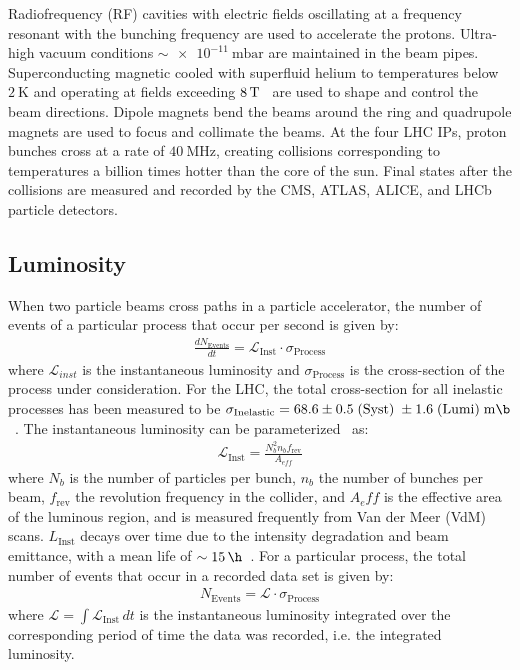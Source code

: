 Radiofrequency (RF) cavities with electric fields oscillating at a frequency resonant with the bunching frequency are used to accelerate the protons.
Ultra-high vacuum conditions $\sim \SI{e-11}{\m \bar}$ are maintained in the beam pipes.
Superconducting magnetic cooled with superfluid helium to temperatures below $\SI{2}{\K}$ and operating at fields exceeding $\SI{8}{\T}$~\cite{LyndonEvans_2008} are used to shape and control the beam directions.
Dipole magnets bend the beams around the ring and quadrupole magnets are used to focus and collimate the beams.
At the four LHC IPs, proton bunches cross at a rate of $\SI{40}{\MHz}$, creating collisions corresponding to temperatures a billion times hotter than the core of the sun.
Final states after the collisions are measured and recorded by the CMS, ATLAS, ALICE, and LHCb particle detectors.

\subsection{Luminosity}
When two particle beams cross paths in a particle accelerator, the number of events of a particular process that occur per second is given by:
\begin{align}
{\frac{dN_{\text {Events}}}{dt}}= \mathcal{L}_{\text{Inst}} \cdot \sigma_{\text{Process}}
\end{align}
where $\mathcal{L}_{inst}$ is the instantaneous luminosity and $\sigma_{\text{Process}}$ is the cross-section of the process under consideration.
For the \beamenergy LHC, the total cross-section for all inelastic processes has been measured to be $\sigma_{\text{Inelastic}} = 68.6 \pm 0.5 \; (\text{Syst}) \; \pm 1.6 \; (\text{Lumi}) \; \si{\m \b}$~\cite{inelasticprotonprotoncrosssection}.
The instantaneous luminosity can be parameterized~\cite{Karacheban:2294183} as:
\begin{align}
\mathcal{L}_{\text{Inst}}=\frac{N_b^2 n_b f_{\mathrm{rev}}}{A_{eff}}
\end{align}
where $N_b$ is the number of particles per bunch, $n_b$ the number of bunches per beam, $f_{\mathrm{rev}}$ the revolution frequency in the collider, and $A_eff$ is the effective area of the luminous region, and is measured frequently from Van der Meer (VdM) scans.
$L_{\text{Inst}}$ decays over time due to the intensity degradation and beam emittance, with a mean life of $\sim \SI{15}{\h}$~\cite{LyndonEvans_2008}.
For a particular process, the total number of events that occur in a recorded data set is given by:
\begin{align}
N_{\text {Events}}= \mathcal{L} \cdot \sigma_{\text{Process}}
\end{align}
where $\mathcal{L} = \int \mathcal{L}_{\text{Inst}} \,dt$ is the instantaneous luminosity integrated over the corresponding period of time the data was recorded, i.e. the integrated luminosity.

